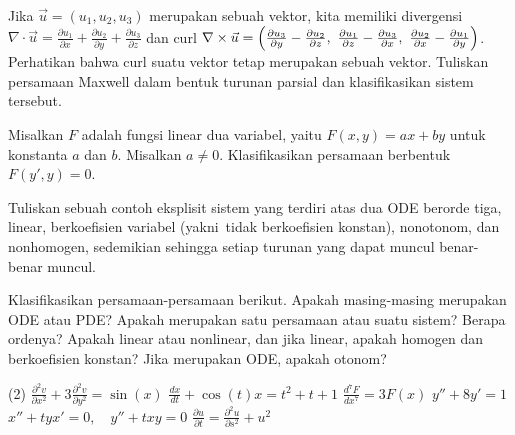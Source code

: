 \begin{exercise}
Jika $\vec{u} = (u_1,u_2,u_3)$ merupakan sebuah vektor, kita memiliki divergensi
$\nabla \cdot \vec{u} =
\frac{\partial u_1}{\partial x} +
\frac{\partial u_2}{\partial y} +
\frac{\partial u_3}{\partial z}$ dan
curl
$\nabla \times \vec{u} =
\Bigl(
\frac{\partial u_3}{\partial y} - \frac{\partial u_2}{\partial z} , ~
\frac{\partial u_1}{\partial z} - \frac{\partial u_3}{\partial x} , ~
\frac{\partial u_2}{\partial x} - \frac{\partial u_1}{\partial y} \Bigr)$.
Perhatikan bahwa curl suatu vektor tetap merupakan sebuah vektor. Tuliskan
persamaan Maxwell dalam bentuk turunan parsial dan klasifikasikan sistem tersebut.
\end{exercise}

\begin{exercise}
Misalkan $F$ adalah fungsi linear dua variabel, yaitu
$F(x,y) = ax+by$ untuk konstanta $a$ dan $b$.
Misalkan $a \neq 0$.
Klasifikasikan persamaan berbentuk $F(y',y) = 0$.
\end{exercise}

\begin{exercise}
Tuliskan sebuah contoh eksplisit sistem yang terdiri atas dua ODE berorde tiga,
linear, berkoefisien variabel (yakni\ tidak berkoefisien konstan), nonotonom,
dan nonhomogen, sedemikian sehingga setiap turunan yang dapat muncul benar-benar
muncul.
\end{exercise}

\setcounter{exercise}{100}

\begin{exercise}
Klasifikasikan persamaan-persamaan berikut. Apakah masing-masing merupakan ODE
atau PDE? Apakah merupakan satu persamaan atau suatu sistem? Berapa ordenya?
Apakah linear atau nonlinear, dan jika linear, apakah homogen dan berkoefisien
konstan? Jika merupakan ODE\@, apakah otonom?
\begin{tasks}(2)
\task $\displaystyle \frac{\partial^2 v}{\partial x^2} + 3 \frac{\partial^2
v}{\partial y^2} = \sin(x)$
\task $\displaystyle \frac{d x}{dt} + \cos(t) x = t^2+t+1$
\task $\displaystyle \frac{d^7 F}{dx^7} = 3F(x)$
\task $\displaystyle y''+8y'=1$
\task $\displaystyle x''+tyx'=0, \quad y''+txy = 0$
\task $\displaystyle \frac{\partial u}{\partial t} = \frac{\partial^2 u}{\partial s^2} + u^2$
\end{tasks}
\end{exercise}

